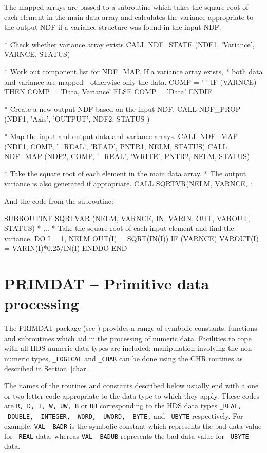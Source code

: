 \documentclass[twoside,11pt,nolof]{starlink}
\begin{document}
The mapped arrays are passed to a subroutine which takes the square root of
each element in the main data array and calculates the variance appropriate
to the output NDF if a variance structure was found  in the input NDF.
\begin{terminalv}
*   Check whether variance array exists
      CALL NDF_STATE (NDF1, 'Variance', VARNCE, STATUS)

*   Work out component list for NDF_MAP. If a variance array exists,
*   both data and variance are mapped - otherwise only the data.
      COMP = ' '
      IF (VARNCE) THEN
         COMP = 'Data, Variance'
      ELSE
          COMP = 'Data'
      ENDIF

*  Create a new output NDF based on the input NDF.
      CALL NDF_PROP (NDF1, 'Axis', 'OUTPUT', NDF2, STATUS )

*  Map the input and output data and variance arrays.
      CALL NDF_MAP (NDF1, COMP, '_REAL', 'READ', PNTR1, NELM, STATUS)
      CALL NDF_MAP (NDF2, COMP, '_REAL', 'WRITE', PNTR2, NELM, STATUS)

*   Take the square root of each element in the main data array.
*   The output variance is also generated if appropriate.
      CALL SQRTVR(NELM, VARNCE, %
     :            %
\end{terminalv}
And the code from the subroutine:
\begin{terminalv}
      SUBROUTINE SQRTVAR (NELM, VARNCE, IN, VARIN, OUT, VAROUT, STATUS)
*     ...
*   Take the square root of each input element and find the variance.
      DO I = 1, NELM
         OUT(I) = SQRT(IN(I))
         IF (VARNCE) VAROUT(I) = VARIN(I)*0.25/IN(I)
      ENDDO
      END
\end{terminalv}

\newpage
\section{PRIMDAT -- Primitive data processing\label{prim}}

The PRIMDAT package (see ) provides a range of symbolic
constants, functions and subroutines which aid in the processing of numeric
data.
Facilities to cope with all HDS numeric data types
are included;
manipulation involving the non-numeric types, \texttt{\_LOGICAL} and {\tt\_CHAR}
can be done using the CHR routines as described in Section~\ref{char}.

The names of the routines and constants described below usually end with a
one or two letter code appropriate to the data type to which they apply.
These codes are \texttt{R, D, I, W, UW, B} or \texttt{UB}  corresponding to the
HDS data types \texttt{\_REAL,
\_DOUBLE, \_INTEGER, \_WORD, \_UWORD, \_BYTE,} and {\tt\_UBYTE} respectively.
For example, \texttt{VAL\_\_BADR} is the symbolic constant which represents the bad
data value for  {\tt\_REAL} data, whereas \texttt{VAL\_\_BADUB} represents the bad
data value for {\tt\_UBYTE} data.
\end{document}
